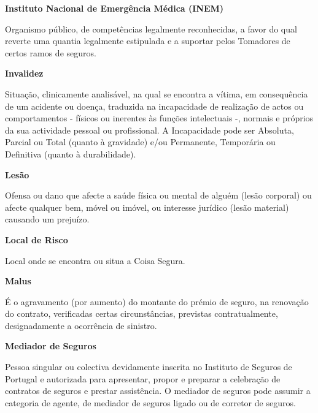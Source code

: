 \begin{description}
\item \textbf{Instituto Nacional de Emergência Médica (INEM)}

Organismo público, de competências legalmente reconhecidas, a favor do qual reverte uma quantia legalmente estipulada e a suportar pelos Tomadores de certos ramos de seguros.
\end{description}

\begin{description}
\item \textbf{Invalidez}

Situação, clinicamente analisável, na qual se encontra a vítima, em consequência de um acidente ou doença, traduzida na incapacidade de realização de actos ou comportamentos - físicos ou inerentes às funções intelectuais -, normais e próprios da sua actividade pessoal ou profissional. A Incapacidade pode ser Absoluta, Parcial ou Total (quanto à gravidade) e/ou Permanente, Temporária ou Definitiva (quanto à durabilidade).
\end{description}

\begin{description}
\item \textbf{Lesão}

Ofensa ou dano que afecte a saúde física ou mental de alguém (lesão corporal) ou afecte qualquer bem, móvel ou imóvel, ou interesse jurídico (lesão material) causando um prejuízo.
\end{description}

\begin{description}
\item \textbf{Local de Risco}

Local onde se encontra ou situa a Coisa Segura.
\end{description}

\begin{description}
\item \textbf{Malus}

É o agravamento (por aumento) do montante do prémio de seguro, na renovação do contrato, verificadas certas circunstâncias, previstas contratualmente, designadamente a ocorrência de sinistro.
\end{description}

\begin{description}
\item \textbf{Mediador de Seguros}

Pessoa singular ou colectiva devidamente inscrita no Instituto de Seguros de Portugal e autorizada para apresentar, propor e preparar a celebração de contratos de seguros e prestar assistência. O mediador de seguros pode assumir a categoria de agente, de mediador de seguros ligado ou de corretor de seguros.
\end{description}

